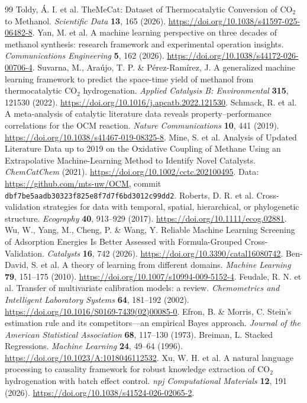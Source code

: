 \begin{thebibliography}{99}\small\setlength{\itemsep}{1pt}
 Toldy, \'A. I. et al. TheMeCat: Dataset of Thermocatalytic Conversion of CO$_2$ to Methanol. \emph{Scientific Data} \textbf{13}, 165 (2026). \url{https://doi.org/10.1038/s41597-025-06482-8}.
 Yan, M. et al. A machine learning perspective on three decades of methanol synthesis: research framework and experimental operation insights. \emph{Communications Engineering} \textbf{5}, 162 (2026). \url{https://doi.org/10.1038/s44172-026-00706-4}.
 Suvarna, M., Ara\'ujo, T. P. \& P\'erez-Ram\'irez, J. A generalized machine learning framework to predict the space-time yield of methanol from thermocatalytic CO$_2$ hydrogenation. \emph{Applied Catalysis B: Environmental} \textbf{315}, 121530 (2022). \url{https://doi.org/10.1016/j.apcatb.2022.121530}.
 Schmack, R. et al. A meta-analysis of catalytic literature data reveals property--performance correlations for the OCM reaction. \emph{Nature Communications} \textbf{10}, 441 (2019). \url{https://doi.org/10.1038/s41467-019-08325-8}.
 Mine, S. et al. Analysis of Updated Literature Data up to 2019 on the Oxidative Coupling of Methane Using an Extrapolative Machine-Learning Method to Identify Novel Catalysts. \emph{ChemCatChem} (2021). \url{https://doi.org/10.1002/cctc.202100495}. Data: \url{https://github.com/mts-uw/OCM}, commit \texttt{dbf7be5aadb30323f825e8f7d7f6bd3012c99dd2}.
 Roberts, D. R. et al. Cross-validation strategies for data with temporal, spatial, hierarchical, or phylogenetic structure. \emph{Ecography} \textbf{40}, 913--929 (2017). \url{https://doi.org/10.1111/ecog.02881}.
 Wu, W., Yang, M., Cheng, P. \& Wang, Y. Reliable Machine Learning Screening of Adsorption Energies Is Better Assessed with Formula-Grouped Cross-Validation. \emph{Catalysts} \textbf{16}, 742 (2026). \url{https://doi.org/10.3390/catal16080742}.
 Ben-David, S. et al. A theory of learning from different domains. \emph{Machine Learning} \textbf{79}, 151--175 (2010). \url{https://doi.org/10.1007/s10994-009-5152-4}.
 Feudale, R. N. et al. Transfer of multivariate calibration models: a review. \emph{Chemometrics and Intelligent Laboratory Systems} \textbf{64}, 181--192 (2002). \url{https://doi.org/10.1016/S0169-7439(02)00085-0}.
 Efron, B. \& Morris, C. Stein's estimation rule and its competitors---an empirical Bayes approach. \emph{Journal of the American Statistical Association} \textbf{68}, 117--130 (1973).
 Breiman, L. Stacked Regressions. \emph{Machine Learning} \textbf{24}, 49--64 (1996). \url{https://doi.org/10.1023/A:1018046112532}.
 Xu, W. H. et al. A natural language processing to causality framework for robust knowledge extraction of CO$_2$ hydrogenation with batch effect control. \emph{npj Computational Materials} \textbf{12}, 191 (2026). \url{https://doi.org/10.1038/s41524-026-02065-2}.


\end{thebibliography}
